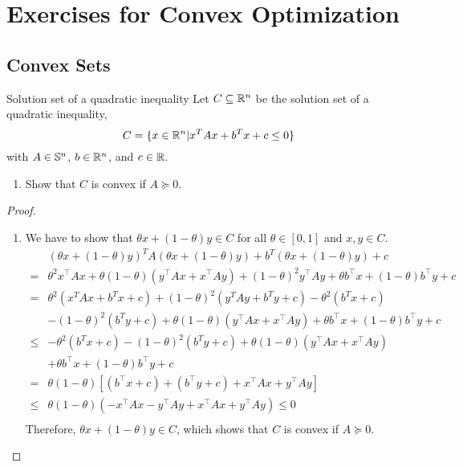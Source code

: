 \chapter{Exercises for Convex Optimization}

\section{Convex Sets}

\begin{exercise}{Solution set of a quadratic inequality}
	Let \(C\subseteq\mathbb{R}^{n}\) be the solution set of a quadratic inequality,
	\begin{equation*}
		C=\{x\in\mathbb{R}^{n}\vert x^{T}Ax+b^{T}x+c\leq 0\}
	\end{equation*}
	with \(A\in\mathbb{S}^{n}\), \(b\in\mathbb{R}^{n}\), and \(c\in\mathbb{R}\).
	\begin{enumerate}
		\item Show that \(C\) is convex if \(A\succeq 0\).
	\end{enumerate}
\end{exercise}

\begin{proof}
	\begin{enumerate}
		\item
		      We have to show that \(\theta x+(1-\theta)y\in C\) for all \(\theta\in[0,1]\) and \(x,y\in C\).
		      \begin{equation*}
			      \begin{aligned}
				           & (\theta x+(1-\theta)y)^{T}A(\theta x+(1-\theta)y)+b^{T}(\theta x+(1-\theta)y)+c                                          \\
				      =    & \theta^2x^{\top}Ax+\theta(1-\theta)(y^{\top}Ax+x^{\top}Ay)+(1-\theta)^2y^{\top}Ay+\theta b^{\top}x+(1-\theta)b^{\top}y+c \\
				      =    & \theta^2(x^{T}Ax+b^{T}x+c)+(1-\theta)^2(y^{T}Ay+b^{T}y+c)-\theta^2(b^{T}x+c)                                             \\
				           & -(1-\theta)^2(b^{T}y+c)+\theta(1-\theta)(y^{\top}Ax+x^{\top}Ay)+\theta b^{\top}x+(1-\theta)b^{\top}y+c                   \\
				      \leq & -\theta^2(b^{T}x+c)-(1-\theta)^2(b^{T}y+c)+\theta(1-\theta)(y^{\top}Ax+x^{\top}Ay)                                       \\
				           & +\theta b^{\top}x+(1-\theta)b^{\top}y+c                                                                                  \\
				      =    & \theta(1-\theta)[(b^{\top}x+c)+(b^{\top}y+c)+x^{\top}Ax+y^{\top}Ay]                                                      \\
				      \leq & \theta(1-\theta)(-x^{\top}Ax-y^{\top}Ay+x^{\top}Ax+y^{\top}Ay)\leq 0                                                     \\
			      \end{aligned}
		      \end{equation*}
		      Therefore, \(\theta x+(1-\theta)y\in C\), which shows that \(C\) is convex if \(A\succeq 0\).
	\end{enumerate}

\end{proof}
